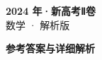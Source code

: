 \documentclass[zihao=-4, a4paper]{ctexart}
\begin{document}
\begin{center}
  {\Large\bfseries 2024 年·新高考Ⅱ卷}\\[4pt]
  {\large 数学 · 解析版}
\end{center}
\medskip
{}

\clearpage
{}
\begin{center}{\Large\bfseries 参考答案与详细解析}\end{center}
\medskip

\end{document}
